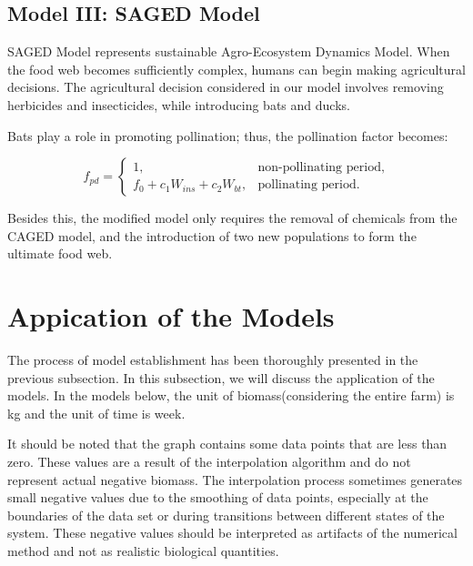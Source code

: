 \documentclass{HZNUMCM}
\begin{document}
    \subsection{Model III: SAGED Model}
      SAGED Model represents sustainable Agro-Ecosystem Dynamics Model.
      When the food web becomes sufficiently complex, humans can begin making agricultural decisions. The agricultural decision considered in our model involves removing herbicides and insecticides, while introducing bats and ducks.

      Bats play a role in promoting pollination; thus, the pollination factor becomes:
      
      \[
      f_{pd} = \begin{cases}
      1, & \text{non-pollinating period}, \\
      f_0 + c_1 W_{ins} + c_2 W_{bt}, & \text{pollinating period}.
      \end{cases}
      \]
      
      Besides this, the modified model only requires the removal of chemicals from the CAGED model, and the introduction of two new populations to form the ultimate food web.

  \section{Appication of the Models}
    The process of model establishment has been thoroughly presented in the previous subsection. 
    In this subsection, we will discuss the application of the models.
    In the models below, the unit of biomass(considering the entire farm) is kg and the unit of time is week.
        
    It should be noted that the graph contains some data points that are less than zero. These values are a result of the interpolation algorithm and do not represent actual negative biomass. 
        The interpolation process sometimes generates small negative values due to the smoothing of data points, 
        especially at the boundaries of the data set or during transitions between different states of the system. 
        These negative values should be interpreted as artifacts of the numerical method and not as realistic biological quantities.
\end{document}
